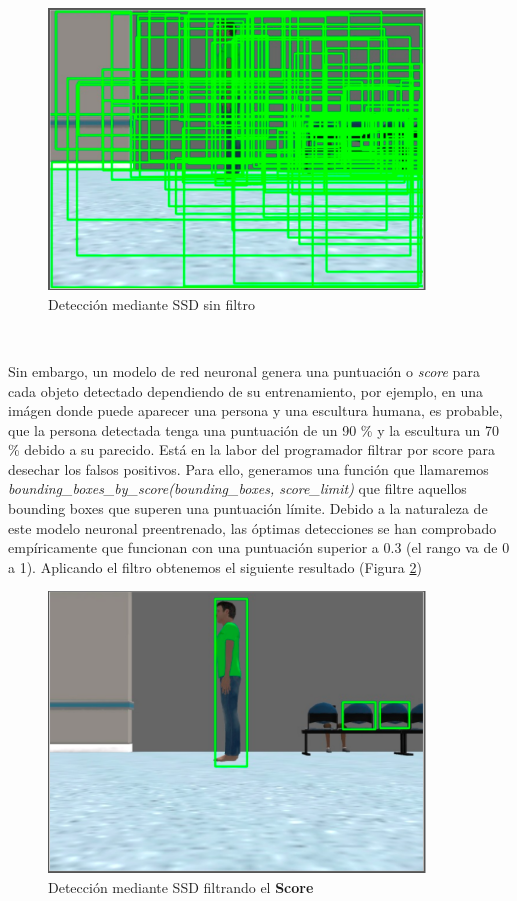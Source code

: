 \begin{figure} [H]
  \begin{center}
    \includegraphics[width=10cm]{imagenes/cap6/deteccion-ssd-sin-filtro.png}
  \end{center}
  \caption[Detección mediante SSD sin filtro]{Detección mediante SSD sin filtro}
  \label{fig:deteccion_ssd_sin_filtro}
\end{figure}\

Sin embargo, un modelo de red neuronal genera una puntuación o \textit{score} para cada objeto detectado dependiendo de su entrenamiento, por ejemplo, en una imágen donde puede aparecer una persona y una escultura humana, es probable, que la persona detectada tenga una puntuación de un 90 \% y la escultura un 70 \% debido a su parecido. Está en la labor del programador filtrar por score para desechar los falsos positivos. Para ello, generamos una función que llamaremos \textit{bounding\_boxes\_by\_score(bounding\_boxes, score\_limit)} que filtre aquellos bounding boxes que superen una puntuación límite. Debido a la naturaleza de este modelo neuronal preentrenado, las óptimas detecciones se han comprobado empíricamente que funcionan con una puntuación superior a 0.3 (el rango va de 0 a 1). Aplicando el filtro obtenemos el siguiente resultado (Figura \ref{fig:deteccion_ssd_filtro_score})\\

\begin{figure} [H]
  \begin{center}
    \includegraphics[width=10cm]{imagenes/cap6/deteccion-ssd-filtro-score.png}
  \end{center}
  \caption[Detección mediante SSD filtrando el \textbf{Score}]{Detección mediante SSD filtrando el \textbf{Score}}
  \label{fig:deteccion_ssd_filtro_score}
\end{figure}\

